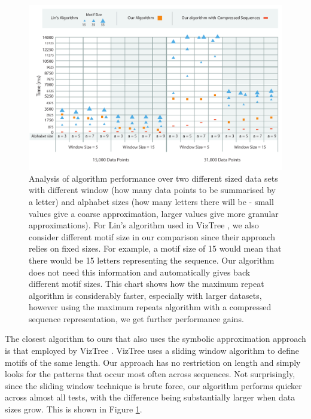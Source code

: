 \begin{figure}[t!]
\centering
\includegraphics[width=\textwidth]{images/timeseries/benchmarks}
\caption{Analysis of algorithm performance over two different sized data sets with different window (how many data points to be summarised by a letter) and alphabet sizes (how many letters there will be - small values give a coarse approximation, larger values give more granular approximations).
For Lin's algorithm used in VizTree \cite{lin2005}, we also consider different motif size in our comparison since their approach relies on fixed sizes.
For example, a motif size of 15 would mean that there would be 15 letters representing the sequence.
Our algorithm does not need this information and automatically gives back different motif sizes.
This chart shows how the maximum repeat algorithm is considerably faster, especially with larger datasets, however using the maximum repeats algorithm with a compressed sequence representation, we get further performance gains.}
\label{fig:benchmarks}
\vspace{-5pt}
\end{figure}


The closest algorithm to ours that also uses the symbolic approximation approach is that employed by VizTree \cite{lin2005}.
VizTree uses a sliding window algorithm to define motifs of the same length.
Our approach has no restriction on length and simply looks for the patterns that occur most often across sequences.
Not surprisingly, since the sliding window technique is brute force, our algorithm performs quicker across almost all tests, with the difference being substantially larger when data sizes grow.
This is shown in Figure \ref{fig:benchmarks}.

